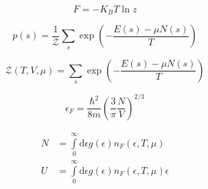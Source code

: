 \begin{equation*}
    F = - K_{B} T \ln z
\end{equation*}

\begin{equation*}
    p(s) = \frac{1}{\mathcal{Z}} \sum_{s} \exp \left(- \frac{E(s) - \mu N(s)}{T} \right)\end{equation*}

\begin{equation*}
    \mathcal{Z}(T,V,\mu) = \sum_{s} \exp \left(- \frac{E(s) - \mu N(s)}{T} \right)
\end{equation*}

\begin{equation*}
    \epsilon_{F} = \frac{\hbar^{2}}{8m} \left(  \frac{3}{\pi} \frac{N}{V} \right)^{2/3}
\end{equation*}

\begin{align*}
    N &= \int\limits^{\infty}_{0} \mathrm{d}\epsilon g(\epsilon)n_{F}(\epsilon,T,\mu) \\
    U &= \int\limits^{\infty}_{0} \mathrm{d}\epsilon g(\epsilon)n_{F}(\epsilon,T,\mu) \epsilon
\end{align*}
